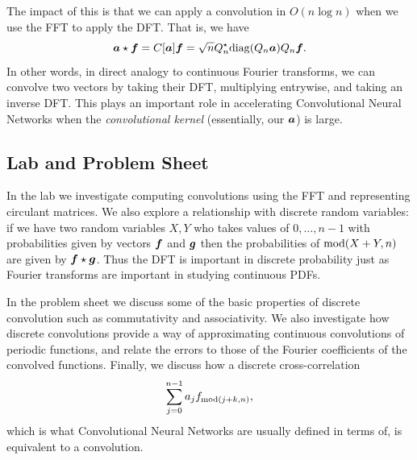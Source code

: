 The impact of this is that we can apply a convolution in $O(n \log n)$ when we use the FFT to apply the DFT.  That is, we have
\[
\bm{{\mbox{\boldmath$a$\unboldmath}}} \star \bm{{\mbox{\boldmath$f$\unboldmath}}} = C[\bm{{\mbox{\boldmath$a$\unboldmath}}}]\bm{{\mbox{\boldmath$f$\unboldmath}}} = \sqrt{n} Q_n^\star {\rm diag}(Q_n \bm{{\mbox{\boldmath$a$\unboldmath}}}) Q_n \bm{{\mbox{\boldmath$f$\unboldmath}}}.
\]
In other words, in direct analogy to continuous Fourier transforms, we can convolve two vectors by taking their DFT, multiplying entrywise, and taking an inverse DFT.  This plays an important role in accelerating Convolutional Neural Networks when the \emph{convolutional kernel} (essentially, our $\bm{{\mbox{\boldmath$a$\unboldmath}}}$) is large. 

\subsection{Lab and Problem Sheet}
In the lab we investigate computing convolutions using the FFT and representing circulant matrices. We also explore a relationship with discrete random variables: if we have two random variables $X,Y$ who takes values of $0,\ensuremath{\ldots},n-1$ with probabilities given by vectors $\bm{{\mbox{\boldmath$f$\unboldmath}}}$ and $\bm{{\mbox{\boldmath$g$\unboldmath}}}$ then the probabilities of ${\rm mod}(X + Y,n)$ are given by $\bm{{\mbox{\boldmath$f$\unboldmath}}} \star \bm{{\mbox{\boldmath$g$\unboldmath}}}$. Thus the DFT is important in discrete probability just as Fourier transforms are important in studying continuous PDFs. 

In the problem sheet we discuss some of the basic properties of discrete convolution such as commutativity and associativity. We also investigate how discrete convolutions provide a way of approximating continuous convolutions of periodic functions, and relate the errors to those of the Fourier coefficients of the convolved functions. Finally, we discuss how a discrete cross-correlation
\[
\ensuremath{\sum}_{j=0}^{n-1} a_j f_{{\rm mod}(j+k,n)},
\]
which is what Convolutional Neural Networks are usually defined in terms of, is equivalent to a convolution.




